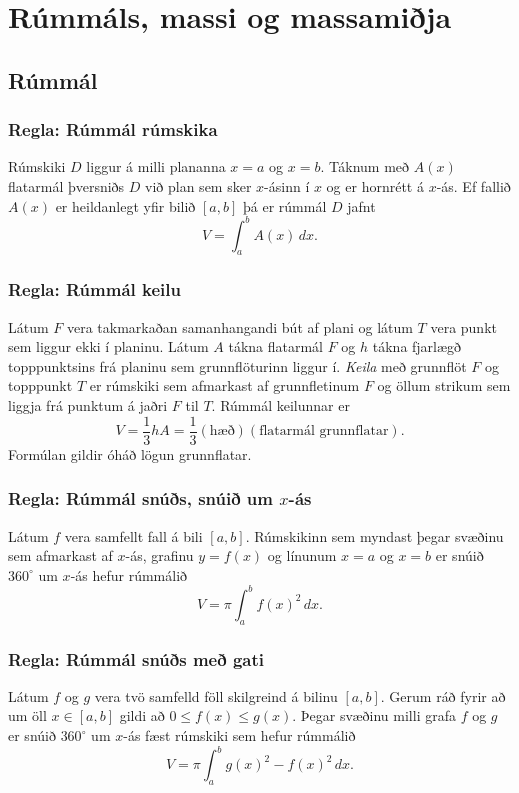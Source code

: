 \documentclass[icelandic,a4paper,12pt]{article}
\date{29. ágúst 2015}
\begin{document}
\setcounter{tocdepth}{2}
\tableofcontents

\section{Rúmmáls, massi og massamiðja}
\subsection{Rúmmál}
\subsubsection{Regla: Rúmmál rúmskika} 
Rúmskiki $D$ liggur á milli plananna $x=a$ og $x=b$. Táknum með $A(x)$ flatarmál
þversniðs $D$ við plan sem sker $x$-ásinn í $x$ og er hornrétt á $x$-ás.  
Ef fallið $A(x)$ er heildanlegt yfir bilið $[a, b]$ þá er 
rúmmál $D$ jafnt $$V=\int_a^b A(x)\,dx.$$

\subsubsection{Regla: Rúmmál keilu} 
Látum $F$ vera takmarkaðan samanhangandi bút af plani og látum $T$ vera punkt sem
liggur ekki í planinu.  Látum $A$ tákna flatarmál $F$ og $h$ tákna
fjarlægð topppunktsins frá planinu sem grunnflöturinn liggur í. \emph{Keila} með 
grunnflöt $F$ og topppunkt $T$ er rúmskiki sem afmarkast af grunnfletinum $F$ og 
öllum strikum sem liggja frá punktum á jaðri $F$ til $T$.  Rúmmál keilunnar er 
$$V=\frac{1}{3}hA=\frac{1}{3}(\mbox{hæð})(\mbox{flatarmál
grunnflatar}).$$ Formúlan gildir óháð lögun grunnflatar.

\subsubsection{Regla: Rúmmál snúðs, snúið um $x$-ás} 
Látum $f$ vera samfellt fall á bili $[a, b]$.  Rúmskikinn sem
myndast þegar svæðinu sem afmarkast af $x$-ás, grafinu $y=f(x)$ og
línunum $x=a$ og $x=b$ er snúið $360^\circ$ um $x$-ás hefur rúmmálið 
$$V=\pi\int_a^b f(x)^2\,dx.$$

\subsubsection{Regla: Rúmmál snúðs með gati} 
Látum $f$ og $g$ vera tvö samfelld föll skilgreind á bilinu $[a, b]$.
Gerum ráð fyrir að um öll $x\in [a, b]$ gildi að $0\leq f(x)\leq
g(x)$.  Þegar svæðinu milli grafa $f$ og $g$  er snúið $360^\circ$ um
$x$-ás fæst rúmskiki sem hefur rúmmálið 
$$V=\pi\int_a^b g(x)^2-f(x)^2\,dx.$$
\end{document}
